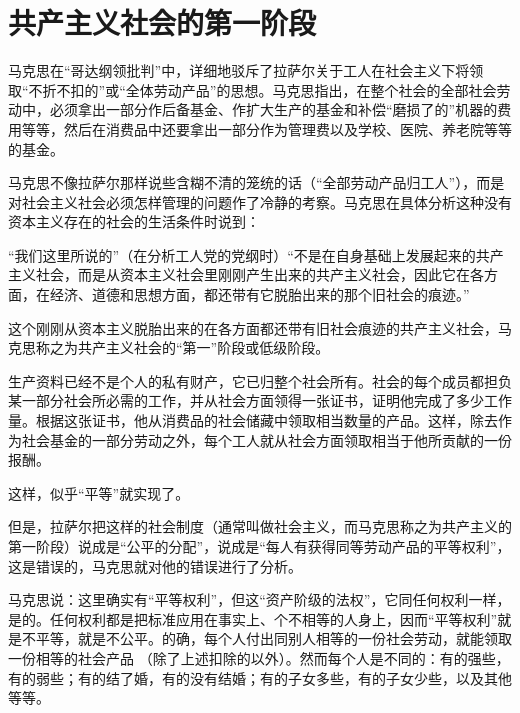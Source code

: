 \chapter{共产主义社会的第一阶段} %

马克思在“哥达纲领批判”中，详细地驳斥了拉萨尔关于工人在社会主义下将领取“不折不扣的”或“全体劳动产品”的思想。马克思指出，在整个社会的全部社会劳动中，必须拿出一部分作后备基金、作扩大生产的基金和补偿“磨损了的”机器的费用等等，然后在消费品中还要拿出一部分作为管理费以及学校、医院、养老院等等的基金。

马克思不像拉萨尔那样说些含糊不清的笼统的话（“全部劳动产品归工人”），而是对社会主义社会必须怎样管理的问题作了冷静的考察。马克思在{\kaishu 具体}分析这种没有资本主义存在的社会的生活条件时说到：

\pskip
\small
\leftskip=10mm

“我们这里所说的”（在分析工人党的党纲时）“不是在自身基础上{\kaishu 发展起来}的共产主义社会，而是从资本主义社会里刚刚{\kaishu 产生出来}的共产主义社会，因此它在各方面，在经济、道德和思想方面，都还带有它脱胎出来的那个旧社会的痕迹。”

\pskip
\normalsize
\leftskip=0mm

这个刚刚从资本主义脱胎出来的在各方面都还带有旧社会痕迹的共产主义社会，马克思称之为共产主义社会的“第一”阶段或低级阶段。

生产资料已经不是个人的私有财产，它已归整个社会所有。社会的每个成员都担负某一部分社会所必需的工作，并从社会方面领得一张证书，证明他完成了多少工作量。根据这张证书，他从消费品的社会储藏中领取相当数量的产品。这样，除去作为社会基金的一部分劳动之外，每个工人就从社会方面领取相当于他所贡献的一份报酬。

这样，似乎“平等”就实现了。

但是，拉萨尔把这样的社会制度（通常叫做社会主义，而马克思称之为共产主义的第一阶段）说成是“公平的分配”，说成是“每人有获得同等劳动产品的平等权利”，这是错误的，马克思就对他的错误进行了分析。

马克思说：这里确实有“平等权利”，但这“资产阶级的法权”，它同任何权利一样，是的。任何权利都是把标准应用在事实上、个不相等的人身上，因而“平等权利”就是不平等，就是不公平。的确，每个人付出同别人相等的一份社会劳动，就能领取一份相等的社会产品 （除了上述扣除的以外）。然而每个人是不同的：有的强些，有的弱些；有的结了婚，有的没有结婚；有的子女多些，有的子女少些，以及其他等等。

